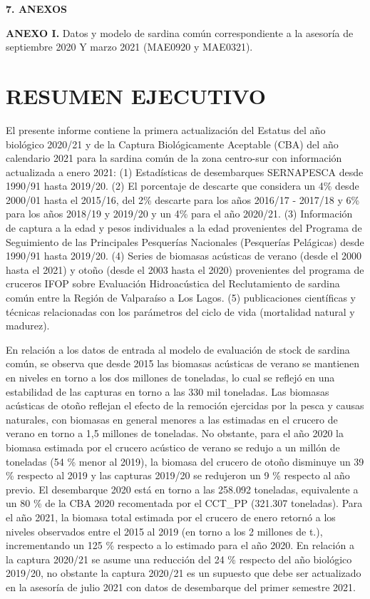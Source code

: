 \documentclass[
  spanish,
]{article}
\author{}
\date{\vspace{-2.5em}}
\begin{document}
{
\setcounter{tocdepth}{3}
\tableofcontents
}
\textbf{7. ANEXOS}

\textbf{ANEXO I.} Datos y modelo de sardina común correspondiente a la
asesoría de septiembre 2020 Y marzo 2021 (MAE0920 y MAE0321).

\pagebreak

\normalsize

\hypertarget{resumen-ejecutivo}{%
\section{RESUMEN EJECUTIVO}\label{resumen-ejecutivo}}

El presente informe contiene la primera actualización del Estatus del
año biológico 2020/21 y de la Captura Biológicamente Aceptable (CBA) del
año calendario 2021 para la sardina común de la zona centro-sur con
información actualizada a enero 2021: (1) Estadísticas de desembarques
SERNAPESCA desde 1990/91 hasta 2019/20. (2) El porcentaje de descarte
que considera un 4\% desde 2000/01 hasta el 2015/16, del 2\% descarte
para los años 2016/17 - 2017/18 y 6\% para los años 2018/19 y 2019/20 y
un 4\% para el año 2020/21. (3) Información de captura a la edad y pesos
individuales a la edad provenientes del Programa de Seguimiento de las
Principales Pesquerías Nacionales (Pesquerías Pelágicas) desde 1990/91
hasta 2019/20. (4) Series de biomasas acústicas de verano (desde el 2000
hasta el 2021) y otoño (desde el 2003 hasta el 2020) provenientes del
programa de cruceros IFOP sobre Evaluación Hidroacústica del
Reclutamiento de sardina común entre la Región de Valparaíso a Los
Lagos. (5) publicaciones científicas y técnicas relacionadas con los
parámetros del ciclo de vida (mortalidad natural y madurez).

En relación a los datos de entrada al modelo de evaluación de stock de
sardina común, se observa que desde 2015 las biomasas acústicas de
verano se mantienen en niveles en torno a los dos millones de toneladas,
lo cual se reflejó en una estabilidad de las capturas en torno a las 330
mil toneladas. Las biomasas acústicas de otoño reflejan el efecto de la
remoción ejercidas por la pesca y causas naturales, con biomasas en
general menores a las estimadas en el crucero de verano en torno a 1,5
millones de toneladas. No obstante, para el año 2020 la biomasa estimada
por el crucero acústico de verano se redujo a un millón de toneladas (54
\% menor al 2019), la biomasa del crucero de otoño disminuye un 39 \%
respecto al 2019 y las capturas 2019/20 se redujeron un 9 \% respecto al
año previo. El desembarque 2020 está en torno a las 258.092 toneladas,
equivalente a un 80 \% de la CBA 2020 recomentada por el CCT\_PP
(321.307 toneladas). Para el año 2021, la biomasa total estimada por el
crucero de enero retornó a los niveles observados entre el 2015 al 2019
(en torno a los 2 millones de t.), incrementando un 125 \% respecto a lo
estimado para el año 2020. En relación a la captura 2020/21 se asume una
reducción del 24 \% respecto del año biológico 2019/20, no obstante la
captura 2020/21 es un supuesto que debe ser actualizado en la asesoría
de julio 2021 con datos de desembarque del primer semestre 2021.
\end{document}
